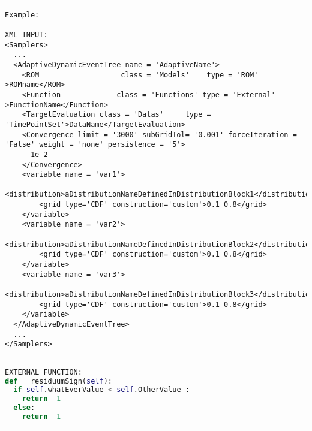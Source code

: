 \begin{lstlisting}[style=XML]
---------------------------------------------------------
Example:
---------------------------------------------------------
XML INPUT:
<Samplers>
  ...
  <AdaptiveDynamicEventTree name = 'AdaptiveName'>
    <ROM                   class = 'Models'    type = 'ROM'            >ROMname</ROM>
    <Function             class = 'Functions' type = 'External'      >FunctionName</Function>
    <TargetEvaluation class = 'Datas'     type = 'TimePointSet'>DataName</TargetEvaluation>
    <Convergence limit = '3000' subGridTol= '0.001' forceIteration = 'False' weight = 'none' persistence = '5'>
      1e-2
    </Convergence>
    <variable name = 'var1'>
        <distribution>aDistributionNameDefinedInDistributionBlock1</distribution> 
        <grid type='CDF' construction='custom'>0.1 0.8</grid>
    </variable>
    <variable name = 'var2'>
        <distribution>aDistributionNameDefinedInDistributionBlock2</distribution> 
        <grid type='CDF' construction='custom'>0.1 0.8</grid>
    </variable>
    <variable name = 'var3'>
        <distribution>aDistributionNameDefinedInDistributionBlock3</distribution> 
        <grid type='CDF' construction='custom'>0.1 0.8</grid>
    </variable>
  </AdaptiveDynamicEventTree>
  ...
</Samplers>
\end{lstlisting}
\begin{lstlisting}[language=python]

EXTERNAL FUNCTION:
def __residuumSign(self):
  if self.whatEverValue < self.OtherValue :
    return  1
  else:
    return -1
---------------------------------------------------------
\end{lstlisting} 
